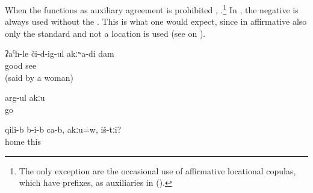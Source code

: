 When the  functions as auxiliary  agreement is prohibited , .\footnote{The only exception are the occasional use of affirmative locational copulas, which have  prefixes, as auxiliaries in  ().} In , the negative  is always used without the   . This is what one would expect, since in affirmative  also only the standard  and not a location  is used (see  on ).
%
\begin{exe}
	\ex	\label{ex:I do not see well}
	\gll	ʡaˁħ-le	či-d-ig-ul	akːʷa-di	dam\\
		good	see		\\
	\glt	{} (said by a woman)

	\ex	\label{ex:He is not going (with his friends)}
	\gll	arg-ul	akːu\\
		go	\\
	\glt	{}

	\ex	\label{ex:They are inside the house, aren't they}
	\gll	qili-b	b-i-b	ca-b,	akːu=w,	iš-tːi?\\
		home				this\\
	\glt	{}
\end{exe}


